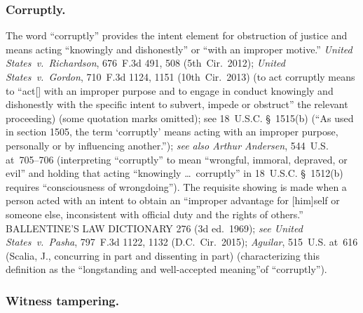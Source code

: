 \subsubsection*{Corruptly.}

The word ``corruptly'' provides the intent element for obstruction of justice and means acting ``knowingly and dishonestly'' or ``with an improper motive.''
\textit{United States~v.\ Richardson}, 676~F.3d 491, 508 (5th~Cir.~2012);
\textit{United States~v.\ Gordon}, 710~F.3d 1124, 1151 (10th~Cir.~2013) (to act corruptly means to ``act[] with an improper purpose and to engage in conduct knowingly and dishonestly with the specific intent to subvert, impede or obstruct'' the relevant proceeding) (some quotation marks omitted);
see 18~U.S.C. \S~1515(b) (``As used in section 1505, the term `corruptly' means acting with an improper purpose, personally or by influencing another.'');
\textit{see also Arthur Andersen}, 544~U.S. at~705--706 (interpreting ``corruptly'' to mean ``wrongful, immoral, depraved, or evil'' and holding that acting ``knowingly \dots\ corruptly'' in 18~U.S.C. \S~1512(b) requires ``consciousness of wrongdoing'').
The requisite showing is made when a person acted with an intent to obtain an ``improper advantage for [him]self or someone else, inconsistent with official duty and the rights of others.''
BALLENTINE'S LAW DICTIONARY 276 (3d ed.~1969);
\textit{see United States~v.\ Pasha}, 797~F.3d 1122, 1132 (D.C.~Cir.~2015);
\textit{Aguilar}, 515~U.S. at~616 (Scalia, J., concurring in part and dissenting in part) (characterizing this definition as the ``longstanding and well-accepted meaning''of ``corruptly'').

\subsubsection*{Witness tampering.}

